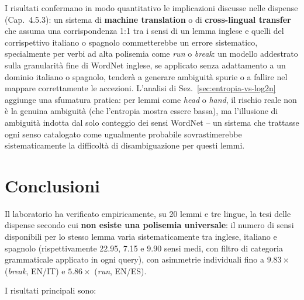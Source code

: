\documentclass[12pt,a4paper]{article}
\begin{document}
I risultati confermano in modo quantitativo le implicazioni discusse nelle dispense (Cap.~4.5.3): un sistema di \textbf{machine translation} o di \textbf{cross-lingual transfer} che assuma una corrispondenza 1:1 tra i sensi di un lemma inglese e quelli del corrispettivo italiano o spagnolo commetterebbe un errore sistematico, specialmente per verbi ad alta polisemia come \textit{run} o \textit{break}: un modello addestrato sulla granularit\`a fine di WordNet inglese, se applicato senza adattamento a un dominio italiano o spagnolo, tender\`a a generare ambiguit\`a spurie o a fallire nel mappare correttamente le accezioni. L'analisi di Sez.~\ref{sec:entropia-vs-log2n} aggiunge una sfumatura pratica: per lemmi come \textit{head} o \textit{hand}, il rischio reale non \`e la genuina ambiguit\`a (che l'entropia mostra essere bassa), ma l'illusione di ambiguit\`a indotta dal solo conteggio dei sensi WordNet -- un sistema che trattasse ogni senso catalogato come ugualmente probabile sovrastimerebbe sistematicamente la difficolt\`a di disambiguazione per questi lemmi.

\section{Conclusioni}

Il laboratorio ha verificato empiricamente, su 20 lemmi e tre lingue, la tesi delle dispense secondo cui \textbf{non esiste una polisemia universale}: il numero di sensi disponibili per lo stesso lemma varia sistematicamente tra inglese, italiano e spagnolo (rispettivamente 22.95, 7.15 e 9.90 sensi medi, con filtro di categoria grammaticale applicato in ogni query), con asimmetrie individuali fino a $9.83\times$ (\textit{break}, EN/IT) e $5.86\times$ (\textit{run}, EN/ES).

I risultati principali sono:
\end{document}
